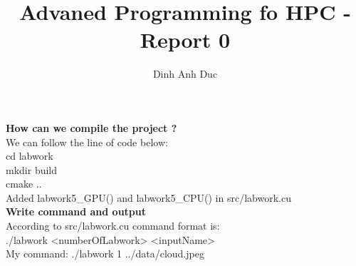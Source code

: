 \documentclass{article}
\title{Advaned Programming fo HPC - Report 0}
\author{Dinh Anh Duc}
\begin{document}
\maketitle

\textbf{How can we compile the project ?}
\\
We can follow the line of code below:
\\
cd labwork
\\
mkdir build
\\
cmake ..
\\
Added labwork5_GPU() and labwork5_CPU() in src/labwork.cu
\\
\textbf{Write command and output}
\\
According to src/labwork.cu command format is:
\\
./labwork <numberOfLabwork> <inputName>
\\
My command: ./labwork 1 ../data/cloud.jpeg
\end{document}
